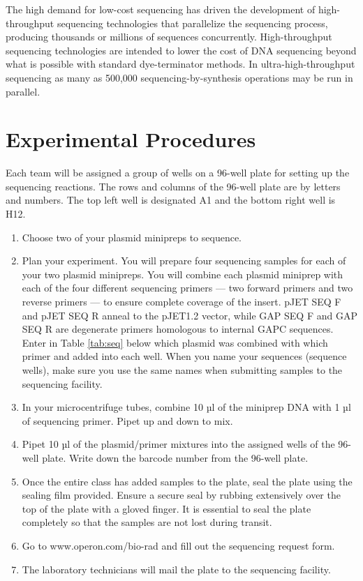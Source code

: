 \documentclass[]{book}
\providecommand{\tightlist}{%
  \setlength{\itemsep}{0pt}\setlength{\parskip}{0pt}}
\theoremstyle{definition}
\theoremstyle{definition}
\theoremstyle{definition}
\theoremstyle{remark}
\begin{document}
The high demand for low-cost sequencing has driven the development of
high-throughput sequencing technologies that parallelize the sequencing
process, producing thousands or millions of sequences concurrently.
High-throughput sequencing technologies are intended to lower the cost
of DNA sequencing beyond what is possible with standard dye-terminator
methods. In ultra-high-throughput sequencing as many as 500,000
sequencing-by-synthesis operations may be run in parallel.

\section{Experimental Procedures}\label{experimental-procedures-17}

Each team will be assigned a group of wells on a 96-well plate for
setting up the sequencing reactions. The rows and columns of the 96-well
plate are by letters and numbers. The top left well is designated A1 and
the bottom right well is H12.

\begin{enumerate}
\def\labelenumi{\arabic{enumi}.}
\tightlist
\item
  Choose two of your plasmid minipreps to sequence.
\item
  Plan your experiment. You will prepare four sequencing samples for
  each of your two plasmid minipreps. You will combine each plasmid
  miniprep with each of the four different sequencing primers --- two
  forward primers and two reverse primers --- to ensure complete
  coverage of the insert. pJET SEQ F and pJET SEQ R anneal to the
  pJET1.2 vector, while GAP SEQ F and GAP SEQ R are degenerate primers
  homologous to internal GAPC sequences. Enter in Table \ref{tab:seq}
  below which plasmid was combined with which primer and added into each
  well. When you name your sequences (sequence wells), make sure you use
  the same names when submitting samples to the sequencing facility.
\item
  In your microcentrifuge tubes, combine 10 µl of the miniprep DNA with
  1 µl of sequencing primer. Pipet up and down to mix.
\item
  Pipet 10 µl of the plasmid/primer mixtures into the assigned wells of
  the 96-well plate. Write down the barcode number from the 96-well
  plate.
\item
  Once the entire class has added samples to the plate, seal the plate
  using the sealing film provided. Ensure a secure seal by rubbing
  extensively over the top of the plate with a gloved finger. It is
  essential to seal the plate completely so that the samples are not
  lost during transit.
\item
  Go to www.operon.com/bio-rad and fill out the sequencing request form.
\item
  The laboratory technicians will mail the plate to the sequencing
  facility.
\end{enumerate}
\end{document}
